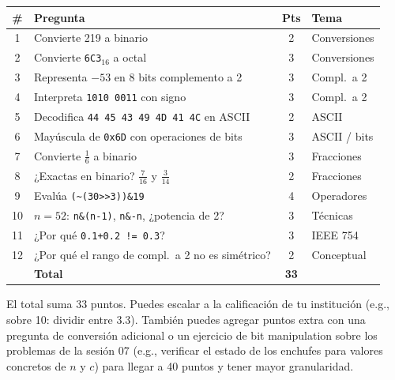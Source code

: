 \documentclass[12pt, oneside]{article}
\begin{document}
\begin{center}
\begin{tabular}{clcl}
  \toprule
  \textbf{\#} & \textbf{Pregunta} & \textbf{Pts} & \textbf{Tema} \\
  \midrule
   1 & Convierte 219 a binario                           & 2  & Conversiones \\
   2 & Convierte \texttt{6C3}$_{16}$ a octal             & 3  & Conversiones \\
   3 & Representa $-53$ en 8 bits complemento a 2        & 3  & Compl.\ a 2 \\
   4 & Interpreta \texttt{1010 0011} con signo            & 3  & Compl.\ a 2 \\
   5 & Decodifica \texttt{44 45 43 49 4D 41 4C} en ASCII  & 2  & ASCII \\
   6 & Mayúscula de \texttt{0x6D} con operaciones de bits & 3  & ASCII / bits \\
   7 & Convierte $\frac{1}{6}$ a binario                 & 3  & Fracciones \\
   8 & ¿Exactas en binario? $\frac{7}{16}$ y $\frac{3}{14}$ & 2 & Fracciones \\
   9 & Evalúa \texttt{(\textasciitilde(30>>3))\&19}       & 4  & Operadores \\
  10 & $n=52$: \texttt{n\&(n-1)}, \texttt{n\&-n}, ¿potencia de 2? & 3 & Técnicas \\
  11 & ¿Por qué \texttt{0.1+0.2 != 0.3}?                 & 3  & IEEE 754 \\
  12 & ¿Por qué el rango de compl.\ a 2 no es simétrico? & 2  & Conceptual \\
  \midrule
     & \textbf{Total}                                    & \textbf{33} & \\
  \bottomrule
\end{tabular}
\end{center}

\begin{notaprofesor}
  El total suma 33 puntos.  Puedes escalar a la calificación de tu
  institución (e.g., sobre 10: dividir entre 3.3).  También puedes
  agregar puntos extra con una pregunta de conversión adicional o un
  ejercicio de bit manipulation sobre los problemas de la sesión 07
  (e.g., verificar el estado de los enchufes para valores concretos
  de $n$ y $c$) para llegar a 40 puntos y tener mayor granularidad.
\end{notaprofesor}
\end{document}
